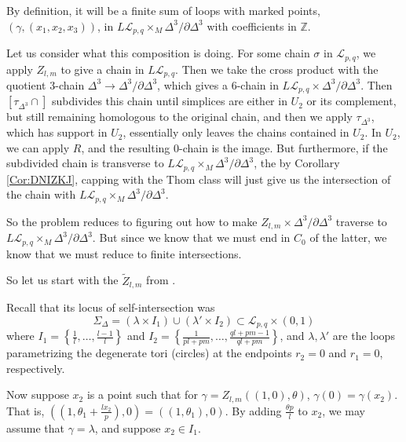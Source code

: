 \documentclass[reqno]{amsart}
\theoremstyle{definition}
\theoremstyle{remark}
\begin{document}
    By definition, it will be a finite sum
    of loops with marked points, $\left( \gamma, \left( x_1,x_2,x_3 \right) 
    \right) $, in
    $L \mathcal{L}_{p,q} \times_M \Delta^3 / \partial \Delta^3$ 
    with coefficients in $\mathbb{Z}$.

    Let us consider what this composition is doing.
    For some chain $\sigma$ in $\mathcal{L}_{p,q}$,
    we apply $Z_{l,m}$ to give a chain
    in $L \mathcal{L}_{p,q}$.
    Then we take the cross product with
    the quotient $3$-chain $\Delta^3 \to \Delta^3 / \partial \Delta^3$,
    which gives a $6$-chain in
    $L \mathcal{L}_{p,q} \times \Delta^3 / \partial \Delta^3$.
    Then $\left[ \tau_{\Delta^3} \cap \right] $ subdivides
    this chain until simplices
    are either in
    $U_2$ or its complement, but still remaining homologous
    to the original chain, and then we apply
    $\tau_{\Delta^3}$, which has support in $U_2$,
    essentially only leaves the chains contained in $U_2$.
     In $U_2$, we can apply
    $R$, and the resulting $0$-chain is the image.
    But furthermore, if
    the subdivided chain is transverse
    to $L \mathcal{L}_{p,q} \times_M \Delta^3 / \partial \Delta^3$, the by
    Corollary \ref{Cor:DNIZKJ}, capping with the Thom
    class will just give us the intersection of the chain with
    $L \mathcal{L}_{p,q} \times_M \Delta^3 / \partial \Delta^3$.

    So the problem reduces to 
    figuring out how to make $Z_{l,m} \times \Delta^3 / \partial \Delta^3$ 
    traverse to $L \mathcal{L}_{p,q} \times_M \Delta^3 / \partial \Delta^3$.
    But since we know that
    we must end in $C_0$ of the latter, we know that we must reduce
    to finite intersections.

    So let us start with the $\tilde{Z}_{l,m}$ from \cite{Naef-Rivera-Wahl}.

    Recall that its locus of self-intersection was
    \[
    \Sigma_{\Delta} = \left( \lambda \times I_1 \right) \cup 
    \left( \lambda' \times I_2 \right) \subset 
    \mathcal{L}_{p,q} \times (0,1)
    \] 
    where
    $I_1 = \left\{ \frac{1}{l},\ldots, \frac{l-1}{l} \right\} $ and
    $I_2 = \left\{ \frac{1}{pl+pm}, \ldots,
    \frac{ql+pm-1}{ql+pm}\right\} $, and
    $\lambda, \lambda'$ are the loops parametrizing the
    degenerate tori (circles) at the endpoints
    $r_2 = 0$ and $r_1 = 0$, respectively.
    
    Now suppose $x_2$ is a point such that
    for $\gamma = Z_{l,m}\left( (1,0), \theta \right) $,
    $\gamma(0) = \gamma(x_2)$.
    That is,
    $\left( \left( 1, \theta_1 + \frac{l x_2}{p} \right)  , 0  \right) 
    = \left( (1, \theta_1), 0 \right) $.
    By adding $\frac{\theta p}{l}$ to $x_2$, we may assume that
    $\gamma = \lambda$, and suppose $x_2 \in I_1$.
\end{document}
